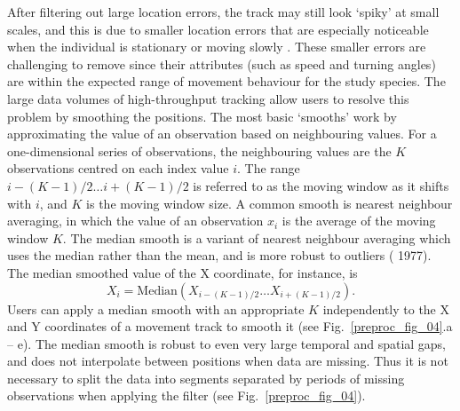 After filtering out large location errors, the track may still look `spiky' at small scales, and this is due to smaller location errors that are especially noticeable when the individual is stationary or moving slowly \citep{noonan2019}.
These smaller errors are challenging to remove since their attributes (such as speed and turning angles) are within the expected range of movement behaviour for the study species. 
The large data volumes of high-throughput tracking allow users to resolve this problem by smoothing the positions. 
The most basic `smooths' work by approximating the value of an observation based on neighbouring values.
For a one-dimensional series of observations, the neighbouring values are the $K$ observations centred on each index value $i$.
The range ${i - (K-1)/2} \ldots {i + (K-1)/2}$ is referred to as the moving window as it shifts with $i$, and $K$ is the moving window size.
A common smooth is nearest neighbour averaging, in which the value of an observation $x_i$ is the average of the moving window $K$.
The median smooth is a variant of nearest neighbour averaging which uses the median rather than the mean, and is more robust to outliers (\citeauthor{tukey1977} 1977).
The median smoothed value of the X coordinate, for instance, is
%
    $$
        X_i = \text{Median}(X_{i - (K-1)/2} \ldots X_{i + (K-1)/2}).
    $$
Users can apply a median smooth with an appropriate $K$ independently to the X and Y coordinates of a movement track to smooth it (see Fig.~\ref{preproc_fig_04}.a -- e).
The median smooth is robust to even very large temporal and spatial gaps, and does not interpolate between positions when data are missing. 
Thus it is not necessary to split the data into segments separated by periods of missing observations when applying the filter (see Fig.~\ref{preproc_fig_04}).

